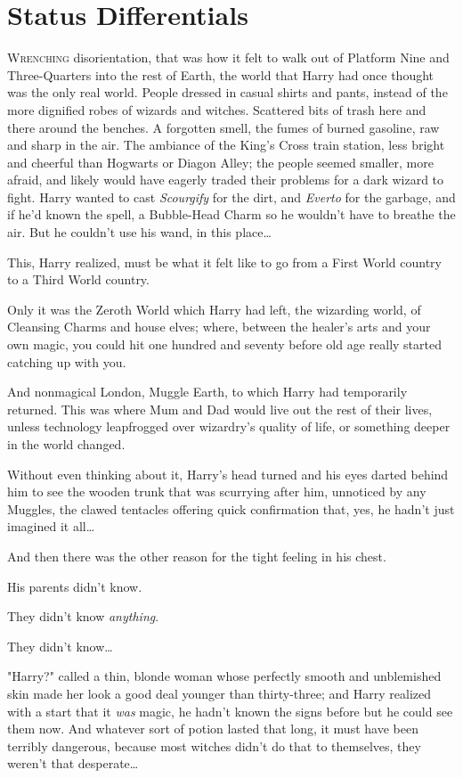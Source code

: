 \chapter{Status Differentials}

\label{ch-StatusDifferentials}

\lettrine{W}{renching}
disorientation, that was how it felt to walk out of Platform Nine and
Three-Quarters into the rest of Earth, the world that Harry had once thought
was the only real world. People dressed in casual shirts and pants, instead of
the more dignified robes of wizards and witches. Scattered bits of trash here
and there around the benches. A forgotten smell, the fumes of burned gasoline,
raw and sharp in the air. The ambiance of the King's Cross train station, less
bright and cheerful than Hogwarts or Diagon Alley; the people seemed smaller,
more afraid, and likely would have eagerly traded their problems for a dark
wizard to fight. Harry wanted to cast \emph{Scourgify} for the dirt, and
\emph{Everto} for the garbage, and if he'd known the spell, a Bubble-Head Charm
so he wouldn't have to breathe the air. But he couldn't use his wand, in this
place{\ldots}

This, Harry realized, must be what it felt like to go from a First World
country to a Third World country.

Only it was the Zeroth World which Harry had left, the wizarding world, of
Cleansing Charms and house elves; where, between the healer's arts and your own
magic, you could hit one hundred and seventy before old age really started
catching up with you.

And nonmagical London, Muggle Earth, to which Harry had temporarily returned.
This was where Mum and Dad would live out the rest of their lives, unless
technology leapfrogged over wizardry's quality of life, or something deeper in
the world changed.

Without even thinking about it, Harry's head turned and his eyes darted behind
him to see the wooden trunk that was scurrying after him, unnoticed by any
Muggles, the clawed tentacles offering quick confirmation that, yes, he hadn't
just imagined it all{\ldots}

And then there was the other reason for the tight feeling in his chest.

His parents didn't know.

They didn't know \emph{anything}.

They didn't know{\ldots}

"Harry?" called a thin, blonde woman whose perfectly smooth and unblemished
skin made her look a good deal younger than thirty-three; and Harry realized
with a start that it \emph{was} magic, he hadn't known the signs before but he
could see them now. And whatever sort of potion lasted that long, it must have
been terribly dangerous, because most witches didn't do that to themselves,
they weren't that desperate{\ldots}

